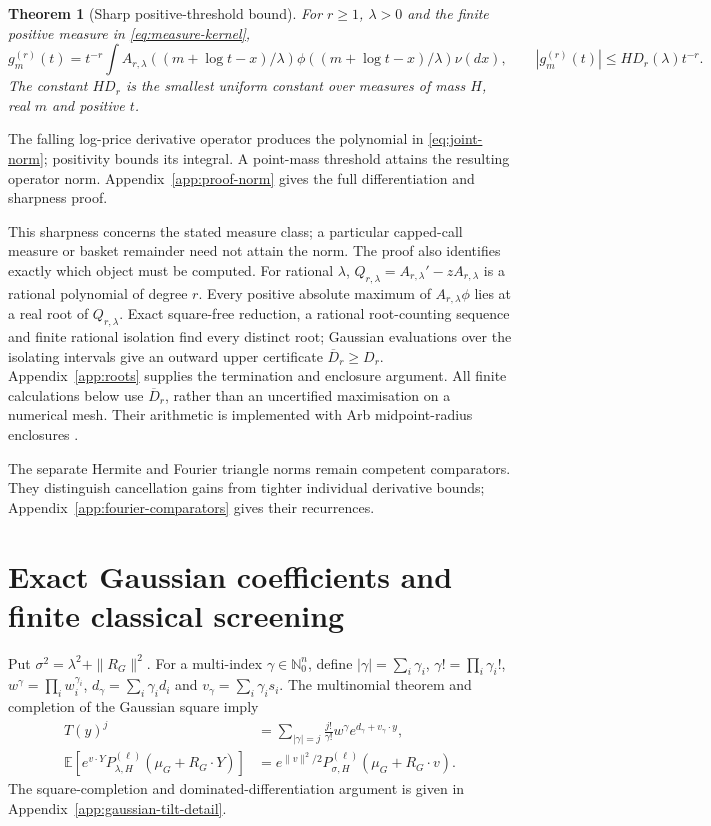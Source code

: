 \documentclass[11pt]{article}
\newtheorem{theorem}{Theorem}[section]
\newcommand{\E}{\mathbb E}
\begin{document}
\begin{theorem}[Sharp positive-threshold bound]
\label{thm:norm}
For $r\geq1$, $\lambda>0$ and the finite positive measure in
\eqref{eq:measure-kernel},
\begin{equation}
 g_m^{(r)}(t)=t^{-r}\int
 A_{r,\lambda}((m+\log t-x)/\lambda)
 \phi((m+\log t-x)/\lambda)\nu(dx),\qquad
 |g_m^{(r)}(t)|\leq HD_r(\lambda)t^{-r}.
 \label{eq:norm-derivative}
\end{equation}
The constant $HD_r$ is the smallest uniform constant over measures of mass
$H$, real $m$ and positive $t$.
\end{theorem}
The falling log-price derivative operator produces the polynomial in \eqref{eq:joint-norm}; positivity bounds its integral. A point-mass threshold attains the resulting operator norm. Appendix~\ref{app:proof-norm} gives the full differentiation and sharpness proof.

This sharpness concerns the stated measure class; a particular capped-call
measure or basket remainder need not attain the norm.  The proof also
identifies exactly which object must be computed.  For rational $\lambda$,
$Q_{r,\lambda}=A_{r,\lambda}'-zA_{r,\lambda}$ is a rational polynomial of
degree $r$.  Every positive absolute maximum of $A_{r,\lambda}\phi$ lies
at a real root of $Q_{r,\lambda}$.  Exact square-free reduction, a rational
root-counting sequence and finite rational isolation find every distinct
root; Gaussian evaluations over the isolating intervals give an outward
upper certificate $\overline D_r\geq D_r$.
Appendix~\ref{app:roots} supplies the termination and enclosure argument.
All finite calculations below use $\overline D_r$, rather than an
uncertified maximisation on a numerical mesh.  Their arithmetic is
implemented with Arb midpoint-radius enclosures \citep{johansson2017}.

The separate Hermite and Fourier triangle norms remain competent comparators. They distinguish cancellation gains from tighter individual derivative bounds; Appendix~\ref{app:fourier-comparators} gives their recurrences.

\section{Exact Gaussian coefficients and finite classical screening}
\label{sec:coefficients}

Put $\sigma^2=\lambda^2+\|R_G\|^2$.
For a multi-index $\gamma\in\mathbb N_0^n$, define
$|\gamma|=\sum_i\gamma_i$, $\gamma!=\prod_i\gamma_i!$,
$w^\gamma=\prod_iw_i^{\gamma_i}$,
$d_\gamma=\sum_i\gamma_id_i$ and
$v_\gamma=\sum_i\gamma_is_i$.
The multinomial theorem and completion of the Gaussian square imply
\begin{align}
 T(y)^j&=\sum_{|\gamma|=j}\frac{j!}{\gamma!}w^\gamma
                   e^{d_\gamma+v_\gamma\cdot y},\label{eq:T-multinomial}\\
 \E[e^{v\cdot Y}P_{\lambda,H}^{(\ell)}(\mu_G+R_G\cdot Y)]
 &=e^{\|v\|^2/2}P_{\sigma,H}^{(\ell)}(\mu_G+R_G\cdot v).
 \label{eq:gaussian-tilt}
\end{align}
The square-completion and dominated-differentiation argument is given in Appendix~\ref{app:gaussian-tilt-detail}.
\end{document}
